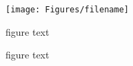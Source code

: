 \begin{figure}[H]
\begin{center}\texttt{[image: Figures/filename]}
\end{center}
\caption{figure text}
\label{fig:fig1}
\end{figure}

\begin{figure}[H]
\centering
{}
\qquad
{}
\caption{figure text}
\label{fig:fig1}
\end{figure}